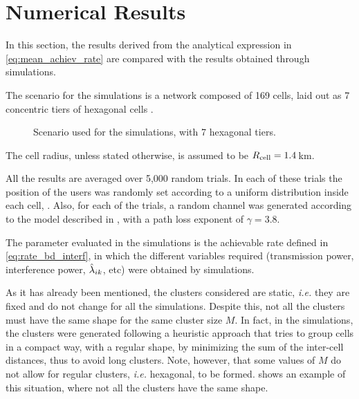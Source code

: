 \section{Numerical Results}\label{sec:achiev_numerical}

In this section, the results derived from the analytical expression in
\eqref{eq:mean_achiev_rate} are compared with the results obtained through
simulations.

The scenario for the simulations is a network composed of 169 cells, laid out as
7 concentric tiers of hexagonal cells .

\begin{figure}[t]
\begin{center}
    \dummybox
\end{center}
\caption{Scenario used for the simulations, with 7 hexagonal tiers.}
\label{fig:simulation_scenario_achiev}
\end{figure}

The cell radius, unless stated otherwise, is assumed to be $R_{\text{cell}}=1.4$\,km.

All the results are averaged over 5,000 random trials. In each of these trials
the position of the users was randomly set according to a uniform distribution
inside each cell, . Also, for each of the trials, a
random channel was generated according to the model described in
, with a path loss exponent of $\gamma=3.8$.

The parameter evaluated in the simulations is the achievable rate defined in
\eqref{eq:rate_bd_interf}, in which the different variables required
(transmission power, interference power, $\hat{\lambda}_{ik}$, etc) were obtained
by simulations.

As it has already been mentioned, the clusters considered are static,
\emph{i.e.} they are fixed and do not change for all the simulations. Despite
this, not all the clusters must have the same shape for the same cluster size
$M$. In fact, in the simulations, the clusters were generated following a
heuristic approach that tries to group cells in a compact way, with a regular
shape, by minimizing the sum of the inter-cell distances, thus to avoid long
clusters. Note, however, that some values of $M$ do not allow for regular
clusters, \emph{i.e.} hexagonal, to be formed. 
shows an example of this situation, where not all the clusters have the same
shape.

